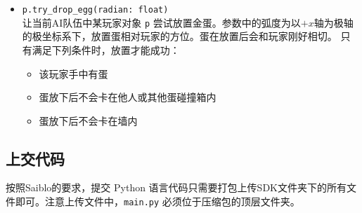 \documentclass{article}
\begin{document}
\begin{description}
\begin{itemize}
\item
\lstinline{p.try_drop_egg(radian: float)}\\[-2pt]
让当前AI队伍中某玩家对象 \lstinline{p} 尝试放置金蛋。参数中的弧度为以$+x$轴为极轴的极坐标系下，放置蛋相对玩家的方位。蛋在放置后会和玩家刚好相切。
只有满足下列条件时，放置才能成功：
	\begin{itemize}\setlength\itemsep{0em}
	\item 该玩家手中有蛋
	\item 蛋放下后不会卡在他人或其他蛋碰撞箱内
	\item 蛋放下后不会卡在墙内
	\end{itemize}
\end{itemize}

\end{description}

\subsection{上交代码}

按照Saiblo的要求，提交 Python 语言代码只需要打包上传SDK文件夹下的所有文件即可。注意上传文件中，\texttt{main.py} 必须位于压缩包的顶层文件夹。
\end{document}
